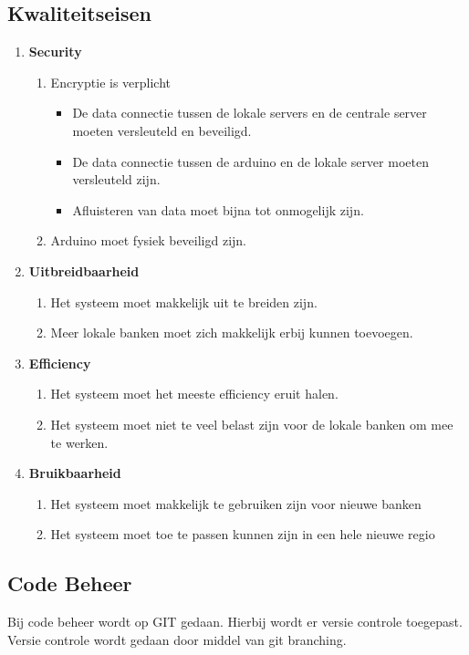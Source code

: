 \documentclass{article}
\begin{document}
\subsection{Kwaliteitseisen}
\begin{enumerate}
	\item \textbf{Security}
	\begin{enumerate}
		\item Encryptie is verplicht
		\begin{itemize}
			\item De data connectie tussen de lokale servers en de centrale server moeten versleuteld en beveiligd.
			\item De data connectie tussen de arduino en de lokale server moeten versleuteld zijn.
			\item Afluisteren van data moet bijna tot onmogelijk zijn.
		\end{itemize}
		\item Arduino moet fysiek beveiligd zijn. 
	\end{enumerate}

	\item \textbf{Uitbreidbaarheid}
	\begin{enumerate}
		\item Het systeem moet makkelijk uit te breiden zijn.
		\item Meer lokale banken moet zich makkelijk erbij kunnen toevoegen.
	\end{enumerate}

	\item \textbf{Efficiency}
	\begin{enumerate}
		\item Het systeem moet het meeste efficiency eruit halen.
		\item Het systeem moet niet te veel belast zijn voor de lokale banken om mee te werken.
	\end{enumerate}
	\item \textbf{Bruikbaarheid}
	\begin{enumerate}
		\item Het systeem moet makkelijk te gebruiken zijn voor nieuwe banken
		\item Het systeem moet toe te passen kunnen zijn in een hele nieuwe regio
	\end{enumerate}
\end{enumerate}

\subsection{Code Beheer}
Bij code beheer wordt op GIT gedaan.
Hierbij wordt er versie controle toegepast.
Versie controle wordt gedaan door middel van git branching.
\end{document}
